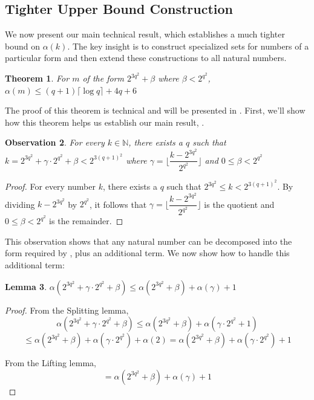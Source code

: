 \documentclass[11pt,a4paper]{article}
\newtheorem{theorem}{Theorem}[section]
\newtheorem{lemma}[theorem]{Lemma}
\newtheorem{observation}[theorem]{Observation}
\theoremstyle{definition}
\begin{document}
\subsection{Tighter Upper Bound Construction}

We now present our main technical result, which establishes a much tighter 
bound on $\alpha(k)$. The key insight is to construct specialized sets for 
numbers of a particular form and then extend these constructions to all 
natural numbers.

\begin{theorem}
	\label{thm:basecase_recursion}
	For $m$ of the form $2^{3q^2}+\beta$ where $\beta < 2^{q^2}$, $\alpha(m) 
	\leq (q+1) \lceil \log{q} \rceil+4q+6$
\end{theorem}

The proof of this theorem is technical and will be presented in 
. First, we'll show how this theorem helps us 
establish our main result, .

\begin{observation}\label{sim_ind_obs}
	For every $k\in \mathbb{N}$, there exists a $q$ such that
	$k=2^{3q^2}+\gamma \cdot 2^{q^2}+\beta < 2^{3(q+1)^2}$ where $\gamma = 
	\lfloor \dfrac{k-2^{3q^2}}{2^{q^2}} \rfloor$ and $0 \leq \beta < 2^{q^2}$
\end{observation}  

\begin{proof}
	For every number $k$, there exists a $q$ such that $2^{3q^2}\leq k < 
	2^{3(q+1)^2}$. By dividing $k-2^{3q^2}$ by $2^{q^2}$, it follows that 
	$\gamma = \lfloor \dfrac{k-2^{3q^2}}{2^{q^2}} \rfloor$ is the quotient and 
	$0 \leq \beta < 2^{q^2}$ is the remainder. 
\end{proof}

This observation shows that any natural number can be decomposed into the 
form required by , plus an additional term. 
We now show how to handle this additional term:

\begin{lemma} \label{break_induction}
	$\alpha(2^{3q^2}+\gamma \cdot 2^{q^2}+\beta)\leq \alpha(2^{3q^2}+\beta)+ 
	\alpha(\gamma)+1$    
\end{lemma}

\begin{proof}
	From the Splitting lemma,   
	$$\alpha(2^{3q^2}+\gamma \cdot 2^{q^2}+\beta)\leq  \alpha(2^{3q^2}+\beta)+
	\alpha(\gamma\cdot 2^{q^2}+1)$$
	$$\leq \alpha(2^{3q^2}+\beta)+\alpha(\gamma\cdot 2^{q^2}) + \alpha(2)= 
	\alpha(2^{3q^2}+\beta)+\alpha(\gamma\cdot 2^{q^2}) + 1$$
	
	From the Lifting lemma, 
	$$=\alpha(2^{3q^2}+\beta)+ \alpha(\gamma)+1$$
\end{proof} 
\end{document}
